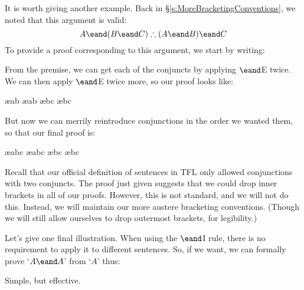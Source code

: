 It is worth giving another example. Back in \S\ref{s:MoreBracketingConventions}, we noted that this argument is valid:
	$$A \eand (B \eand C) \therefore (A \eand B) \eand C$$
To provide a proof corresponding to this argument, we start by writing:
\begin{fitchproof}
\end{fitchproof}
From the premise, we can get each of the conjuncts by applying $\eand$E twice. We can then apply $\eand$E twice more, so our proof looks like:
\begin{fitchproof}
	 \ae{ab}
	 \ae{ab}
	 \ae{bc}
	 \ae{bc}
\end{fitchproof}
But now we can merrily reintroduce conjunctions in the order we wanted them, so that our final proof is:
\begin{fitchproof}
	 \ae{abc}
	 \ae{abc}
	 \ae{bc}
	 \ae{bc}
\end{fitchproof}
Recall that our official definition of sentences in TFL only allowed conjunctions with two conjuncts. The proof just given suggests that we could drop inner brackets in all of our proofs. However, this is not standard, and we will not do this. Instead, we will maintain our more austere bracketing conventions. (Though we will still allow ourselves to drop outermost brackets, for legibility.)

Let's give one final illustration. When using the $\eand$I rule, there is no requirement to apply it to different sentences. So, if we want, we can formally prove `$A \eand A$' from `$A$' thus:
\begin{fitchproof}
\end{fitchproof}
Simple, but effective.

